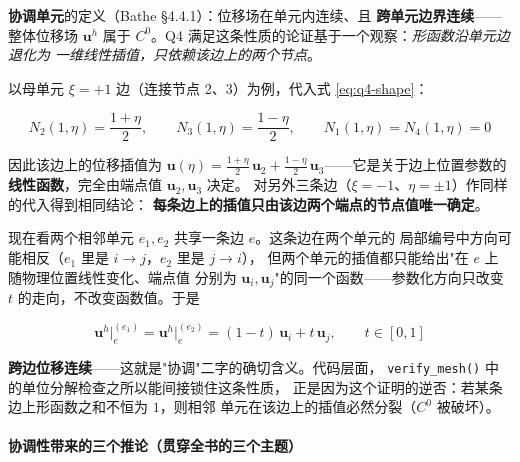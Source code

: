 \documentclass[12pt,a4paper]{ctexart}
\newcommand{\fem}{\Verb}
\begin{document}
\textbf{协调单元}的定义（Bathe §4.4.1）：位移场在单元内连续、且
\textbf{跨单元边界连续}——整体位移场 $\mathbf{u}^h$ 属于 $C^0$。Q4
满足这条性质的论证基于一个观察：\emph{形函数沿单元边退化为
一维线性插值，只依赖该边上的两个节点}。

以母单元 $\xi = +1$ 边（连接节点 2、3）为例，代入式
\eqref{eq:q4-shape}：

\begin{equation}
N_2(1,\eta) = \frac{1+\eta}{2}, \qquad
N_3(1,\eta) = \frac{1-\eta}{2}, \qquad
N_1(1,\eta) = N_4(1,\eta) = 0
\end{equation}

因此该边上的位移插值为
$\mathbf{u}(\eta) = \frac{1+\eta}{2}\,\mathbf{u}_2 +
\frac{1-\eta}{2}\,\mathbf{u}_3$——它是关于边上位置参数的
\textbf{线性函数}，完全由端点值 $\mathbf{u}_2, \mathbf{u}_3$ 决定。
对另外三条边（$\xi=-1$、$\eta=\pm1$）作同样的代入得到相同结论：
\textbf{每条边上的插值只由该边两个端点的节点值唯一确定}。

现在看两个相邻单元 $e_1, e_2$ 共享一条边 $e$。这条边在两个单元的
局部编号中方向可能相反（$e_1$ 里是 $i\to j$，$e_2$ 里是 $j\to i$），
但两个单元的插值都只能给出"在 $e$ 上随物理位置线性变化、端点值
分别为 $\mathbf{u}_i, \mathbf{u}_j$"的同一个函数——参数化方向只改变
$t$ 的走向，不改变函数值。于是

\begin{equation}
\mathbf{u}^{h}\big|_{e}^{(e_1)} = \mathbf{u}^{h}\big|_{e}^{(e_2)} =
(1-t)\,\mathbf{u}_i + t\,\mathbf{u}_j, \qquad t \in [0,1]
\label{eq:q4-c0}
\end{equation}

\textbf{跨边位移连续}——这就是"协调"二字的确切含义。代码层面，
\fem|verify_mesh()| 中的单位分解检查之所以能间接锁住这条性质，
正是因为这个证明的逆否：若某条边上形函数之和不恒为 $1$，则相邻
单元在该边上的插值必然分裂（$C^0$ 被破坏）。

\paragraph{协调性带来的三个推论（贯穿全书的三个主题）}
\end{document}
